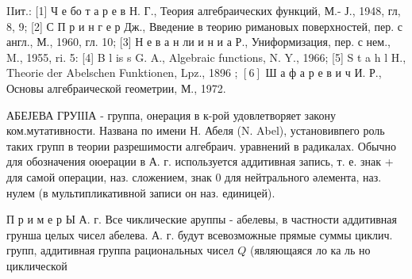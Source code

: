 \documentclass[10pt]{article}
\begin{document}
IIит.: [1] Ч е бо т а р е в Н. Г., Теория алгебраических функций, М.- Ј., 1948, гл, 8, 9; [2] С П р и н г е р Дж., Введение в теорию римановых поверхностей, пер. с англ., М., 1960, гл. 10; [3] Н е в а н ли и н и а Р., Униформизация, пер. с нем., M., 1955, ri. 5: [4] B l is s G. A., Algebraic functions, N. Y., 1966; [5] S t a h l H., Theorie der Abelschen Funktionen, Lpz., 1896 ; $[6]$ Ш а ф а р е в и ч И. Р., Основы алгебраической геометрии, М., 1972.

АБЕЈЕВА ГРУІІІА - группа, онерация в к-рой удовлетворяет закону ком.мутативности. Названа по имени Н. Абеля (N. Abel), установивпего роль таких групп в теории разрешимости алгебраич. уравнений в радикалах. Обычно для обозначения оюерации в А. г. используется аддитивная запись, т. е. знак + для самой операции, наз. сложением, знак 0 для нейтрального әлемента, наз. нулем (в мультипликативной записи он наз. единицей).

П р и м е р Ы А. г. Все чиклические аруппы - абелевы, в частности аддитивная грунша целых чисел абелева. А. г. будут всевозможные прямые суммы циклич. групп, аддитивная группа рациональных чисел $Q$ (являющаяся ло ка ль но циклической
\end{document}
